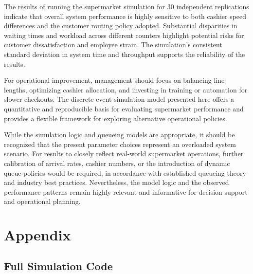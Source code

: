 \documentclass[
]{article}
\begin{document}
\justifying

The results of running the supermarket simulation for 30 independent
replications indicate that overall system performance is highly
sensitive to both cashier speed differences and the customer routing
policy adopted. Substantial disparities in waiting times and workload
across different counters highlight potential risks for customer
dissatisfaction and employee strain. The simulation's consistent
standard deviation in system time and throughput supports the
reliability of the results.

For operational improvement, management should focus on balancing line
lengths, optimizing cashier allocation, and investing in training or
automation for slower checkouts. The discrete-event simulation model
presented here offers a quantitative and reproducible basis for
evaluating supermarket performance and provides a flexible framework for
exploring alternative operational policies.

While the simulation logic and queueing models are appropriate, it
should be recognized that the present parameter choices represent an
overloaded system scenario. For results to closely reflect real-world
supermarket operations, further calibration of arrival rates, cashier
numbers, or the introduction of dynamic queue policies would be
required, in accordance with established queueing theory and industry
best practices. Nevertheless, the model logic and the observed
performance patterns remain highly relevant and informative for decision
support and operational planning.

\newpage
\centering

\section{Appendix}\label{appendix}

\justifying

\subsection{Full Simulation Code}\label{full-simulation-code}
\end{document}
